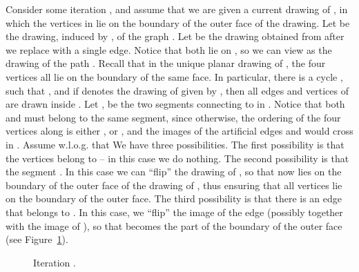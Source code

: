 \documentclass[twoside,leqno,twocolumn]{article}
\begin{document}
Consider some iteration , and assume that we are given a current drawing  of , in which the vertices in 
 lie on the boundary  of the outer face  of the drawing. Let  be the drawing, induced by , of the graph . Let  be the drawing obtained from  after we replace  with a single edge. Notice that  both lie on , so we can view  as the drawing of the path . Recall that in the unique planar drawing  of , the four vertices  all lie on the boundary of the same face. In particular, there is a cycle , such that , and if  denotes the drawing of  given by , then all edges and vertices of  are drawn inside . Let ,  be the two segments connecting  to  in . Notice that both  and  must belong to the same segment, since otherwise, the ordering of the four vertices along  is  either , or , and the images of the artificial edges  and  would cross in . Assume w.l.o.g. that 
 We have three possibilities. The first possibility is that the vertices  belong to  -- in this case we do nothing. The second possibility is that the segment . In this case we can ``flip'' the drawing of , so that now  lies on the boundary of the outer face of the drawing of , thus ensuring that all vertices   lie on the boundary of the outer face.
The third possibility is that there is an edge  that belongs to . In this case, we ``flip'' the image of the edge  (possibly together with the image of ), so that  becomes the part of the boundary of the outer face (see Figure~\ref{fig: flipping one round}).

\begin{figure}
\begin{center}
\ifabstract
{}
\fi\iffull
{}
\fi
\caption{Iteration .\label{fig: flipping one round}}
\end{center}
\end{figure}

\iffalse
We now obtain a planar embedding of  from , as follows. Since none of the blocks , for , belongs to , 
in the unique planar drawing  of , the four vertices , ,  and  
lie on the boundary of same face of the embedding. 
Let  be the embedding of , induced by the initial planar embedding  of , and let  be the embedding of  induced by . Observe that since  is a planar embedding of , it also induces a planar embedding  of , as follows: start with , and erase all edges and vertices, except for those participating in ,  and . Now route the artificial edge  along the image of the path , and the artificial edge  along the image of the path . Since graph  has a unique planar embedding,  must be identical to . Therefore, the four vertices  lie on the boundary of the same face of . Moreover, the circular ordering of these vertices is either , or  (since otherwise, the images of the artificial edges  and  would cross in .
\fi
\end{document}
